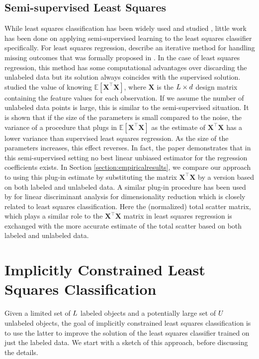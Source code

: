\documentclass{elsarticle}
\begin{document}
\subsection*{Semi-supervised Least Squares}
While least squares classification has been widely used and studied \cite{Hastie2001, Poggio2003, Suykens1999}, little work has been done on applying semi-supervised learning to the least squares classifier specifically. For least squares regression, \cite{Little2002} describe an iterative method for handling missing outcomes that was formally proposed in \cite{Healy1956}. In the case of least squares regression, this method has some computational advantages over discarding the unlabeled data but its solution always coincides with the supervised solution. \cite{Shaffer1991} studied the value of knowing $\mathbb{E}[\mathbf{X}^\top\mathbf{X}]$, where $\mathbf{X}$ is the $L \times d$ design matrix containing the feature values for each observation. If we assume the number of unlabeled data points is large, this is similar to the semi-supervised situation. It is shown that if the size of the parameters is small compared to the noise, the variance of a procedure that plugs in $\mathbb{E}[\mathbf{X}^\top\mathbf{X}]$ as the estimate of $\mathbf{X}^\top\mathbf{X}$ has a lower variance than supervised least squares regression.  As the size of the parameters increases, this effect reverses. In fact, the paper demonstrates that in this semi-supervised setting no best linear unbiased estimator for the regression coefficients exists. In Section \ref{section:empiricalresults}, we compare our approach to using this plug-in estimate by substituting the matrix $\mathbf{X}^\top\mathbf{X}$ by a version based on both labeled and unlabeled data. 
A similar plug-in procedure has been used by \cite{Fan2008} for linear discriminant analysis for dimensionality reduction which is closely related to least squares classification. Here the (normalized) total scatter matrix, which plays a similar role to the $\mathbf{X}^\top\mathbf{X}$ matrix in least squares regression is exchanged with the more accurate estimate of the total scatter based on both labeled and unlabeled data.

\section{Implicitly Constrained Least Squares Classification}
\label{section:overview}
Given a limited set of $L$ labeled objects and a potentially large set of $U$ unlabeled objects, the goal of implicitly constrained least squares classification is to use the latter to improve the solution of the least squares classifier trained on just the labeled data. We start with a sketch of this approach, before discussing the details.
\end{document}
